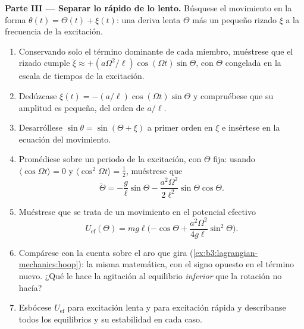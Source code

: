 \begin{problem}
\medskip\noindent\textbf{Parte III --- Separar lo rápido de lo lento.}
Búsquese el movimiento en la forma $\theta(t) = \Theta(t) + \xi(t)$: una
deriva lenta $\Theta$ más un pequeño rizado $\xi$ a la frecuencia de la
excitación.
\begin{enumerate}[resume]
  \item Conservando solo el término dominante de cada miembro, muéstrese que
        el rizado cumple $\ddot\xi \approx +(a\Omega^2/\ell)\cos(\Omega t)
        \sin\Theta$, con $\Theta$ congelada en la escala de tiempos de la
        excitación.
  \item Dedúzcase $\xi(t) = -(a/\ell)\cos(\Omega t)\sin\Theta$ y compruébese
        que su amplitud es pequeña, del orden de $a/\ell$.
  \item Desarróllese $\sin\theta = \sin(\Theta + \xi)$ a primer orden en
        $\xi$ e insértese en la ecuación del movimiento.
  \item Promédiese sobre un periodo de la excitación, con $\Theta$ fija:
        usando $\langle\cos\Omega t\rangle = 0$ y
        $\langle\cos^2\Omega t\rangle = \tfrac12$, muéstrese que
        \[
        \ddot\Theta = -\frac{g}{\ell}\sin\Theta
         - \frac{a^2\Omega^2}{2\ell^2}\sin\Theta\cos\Theta .
        \]
  \item Muéstrese que se trata de un movimiento en el potencial efectivo
        \[
        U_{\text{ef}}(\Theta) = mg\ell\Big({-\cos\Theta}
         + \frac{a^2\Omega^2}{4g\ell}\sin^2\Theta\Big) .
        \]
  \item Compárese con la cuenta sobre el aro que gira
        (\cref{ex:b3:lagrangian-mechanics:hoop}): la misma matemática, con
        el signo opuesto en el término nuevo. ¿Qué le hace la agitación al
        equilibrio \emph{inferior} que la rotación no hacía?
  \item Esbócese $U_{\text{ef}}$ para excitación lenta y para excitación
        rápida y descríbanse todos los equilibrios y su estabilidad en cada caso.
\end{enumerate}


\end{problem}
